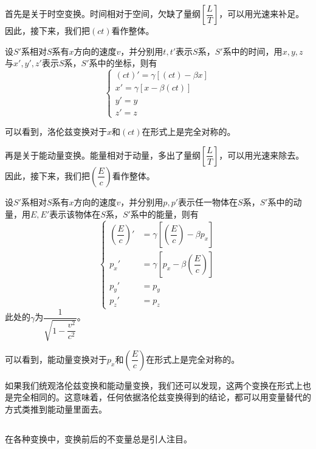 首先是关于时空变换。时间相对于空间，欠缺了量纲$\left[\dfrac{L}{T}\right]$，可以用光速来补足。因此，接下来，我们把$(ct)$看作整体。
\begin{law}
    设$S'$系相对$S$系有$x$方向的速度$v$，并分别用$t,t'$表示$S$系，$S'$系中的时间，用$x,y,z$与$x',y',z'$表示$S$系，$S'$系中的坐标，则有
    \[\left\{\begin{array}{l}
            (ct)'=\gamma[(ct)-\beta x] \\
            x'=\gamma[x-\beta(ct)]     \\
            y'=y                       \\
            z'=z
        \end{array}\right.\]
\end{law}

可以看到，洛伦兹变换对于$x$和$(ct)$在形式上是完全对称的。

再是关于能动量变换。能量相对于动量，多出了量纲$\left[\dfrac{L}{T}\right]$，可以用光速来除去。因此，接下来，我们把$\left(\dfrac{E}{c}\right)$看作整体。
\begin{law}
    设$S'$系相对$S$系有$x$方向的速度$v$，并分别用$p,p'$表示任一物体在$S$系，$S'$系中的动量，用$E,E'$表示该物体在$S$系，$S'$系中的能量，则有
    \[\left\{\begin{aligned}
            \left(\dfrac{E}{c}\right)' & =\gamma\left[\left(\dfrac{E}{c}\right)-\beta p_x\right] \\
            p_x'                       & =\gamma\left[p_x-\beta\left(\dfrac{E}{c}\right)\right]  \\
            p_y'                       & =p_y                                                    \\
            p_z'                       & =p_z
        \end{aligned}\right.\]
    此处的$\gamma$为$\dfrac{1}{\sqrt{1-\dfrac{v^2}{c^2}}}$。
\end{law}

可以看到，能动量变换对于$p_x$和$\left(\dfrac{E}{c}\right)$在形式上是完全对称的。

如果我们统观洛伦兹变换和能动量变换，我们还可以发现，这两个变换在形式上也是完全相同的。这意味着，任何依据洛伦兹变换得到的结论，都可以用变量替代的方式类推到能动量里面去。
\subsection[不变量]{}
在各种变换中，变换前后的不变量总是引人注目。

